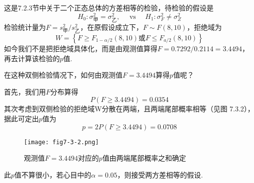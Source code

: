 \begin{solution}
这是7.2.3节中关于二个正态总体的方差相等的检验，待检验的假设是
\[H _ { 0 } : \sigma _ { \text{甲} } ^ { 2 } = \sigma _ { \text{乙} } ^ { 2 } , \quad \text { vs } \quad H _ { 1 } : \sigma _ { F } ^ { 2 } \neq \sigma _ { Z } ^ { 2 }\]
检验统计量为$F = s _ { \text{甲}  } ^ { 2 } / s _ { \text{乙}  } ^ { 2 }$，在原假设成立下，$F \sim F ( 8,10 )$，拒绝域为
\[
W=\left\{F\geq F_{1-\alpha/2}\left(8,10\right)\textrm{或}F\leq F_{a/2}\left(8,10\right)\right\}
\]
如今我们不是把拒绝域具体化，而是由观测值算得$F=0.7292/0.2114=
3.4494$，再去计算该检验的$p$值.

在这种双侧检验情况下，如何由观测值$F=3.4494$算得$p$值呢？

首先，我们用$F$分布算得
\[P ( F \geq 3.4494 ) = 0.0354\]
其次考虑到双侧检验的拒绝域W分散在两端，且两端尾部概率相等（见图
7.3.2），据此可定出$p$值为
\[p = 2 P ( F \geq 3.4494 ) = 0.0708\]

\begin{figure}[htbp]
	\centering
	\texttt{[image: fig7-3-2.png]}
	\caption{观测值$F=3.4494$对应的$p$值由两端尾部概率之和确定}\label{fig7.3.2}
\end{figure}

此$p$值不算很小，若心目中的$\alpha=0.05$，则接受两方差相等的假设.
\end{solution}
